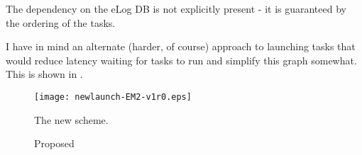 \documentclass{article}
\begin{document}
The dependency on the eLog DB is not explicitly present - it is guaranteed by
the ordering of the tasks.

I have in mind an alternate (harder, of course) approach to launching tasks
that would reduce latency waiting for tasks to run and simplify this graph
somewhat.  This is shown in {}.


\begin{figure}
\caption{Proposed}

\texttt{[image: newlaunch-EM2-v1r0.eps]}

{The new scheme.}

\label{newlaunch-fig}
\end{figure}
\end{document}
